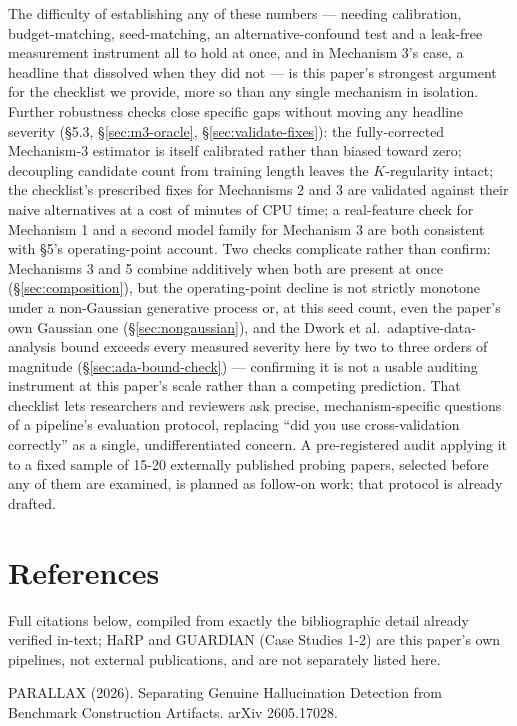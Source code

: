 \documentclass[10pt]{article} %
\begin{document}
The difficulty of establishing any of these numbers --- needing calibration,
budget-matching, seed-matching, an alternative-confound test and a leak-free
measurement instrument all to hold at once, and in Mechanism 3's case, a
headline that dissolved when they did not --- is this paper's strongest
argument for the checklist we provide, more so than any single mechanism in
isolation. Further robustness checks close specific gaps without moving any
headline severity (§5.3, §\ref{sec:m3-oracle}, §\ref{sec:validate-fixes}):
the fully-corrected Mechanism-3 estimator is itself calibrated rather than
biased toward zero; decoupling candidate count from training length leaves
the $K$-regularity intact; the checklist's prescribed fixes for Mechanisms 2
and 3 are validated against their naive alternatives at a cost of minutes of
CPU time; a real-feature check for Mechanism 1 and a second model family for
Mechanism 3 are both consistent with §5's operating-point account. Two
checks complicate rather than confirm: Mechanisms 3 and 5 combine additively
when both are present at once (§\ref{sec:composition}), but the
operating-point decline is not strictly monotone under a non-Gaussian
generative process or, at this seed count, even the paper's own Gaussian one
(§\ref{sec:nongaussian}), and the Dwork et al.\ adaptive-data-analysis bound
exceeds every measured severity here by two to three orders of magnitude
(§\ref{sec:ada-bound-check}) --- confirming it is not a usable auditing
instrument at this paper's scale rather than a competing prediction. That
checklist lets researchers and reviewers ask precise, mechanism-specific
questions of a pipeline's evaluation protocol, replacing ``did you use
cross-validation correctly'' as a single, undifferentiated concern. A
pre-registered audit applying it to a fixed sample of 15-20 externally
published probing papers, selected before any of them are examined, is
planned as follow-on work; that protocol is already drafted.

\section{References}

Full citations below, compiled from exactly the bibliographic detail
already verified in-text; HaRP and GUARDIAN (Case Studies 1-2) are this
paper's own pipelines, not external publications, and are not separately
listed here.

PARALLAX (2026). Separating Genuine Hallucination Detection from
Benchmark Construction Artifacts. arXiv 2605.17028.
\end{document}
